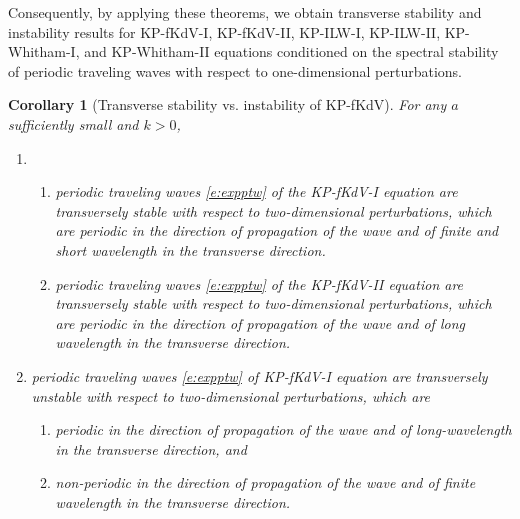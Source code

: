 \documentclass[12pt]{amsart}    %
\newtheorem{corollary}[theorem]{Corollary}
\numberwithin{equation}{section}
\begin{document}
Consequently, by applying these theorems, we obtain transverse stability and instability results for KP-fKdV-I, KP-fKdV-II, KP-ILW-I, KP-ILW-II, KP-Whitham-I, and KP-Whitham-II equations conditioned on the spectral stability of periodic traveling waves with respect to one-dimensional perturbations.
\begin{corollary}[Transverse stability vs. instability of KP-fKdV]\label{c:fkdv}
For any $a$ sufficiently small and $k>0$, 
\begin{enumerate}
\item 
\begin{enumerate}
    \item periodic traveling waves \eqref{e:expptw} of the KP-fKdV-I equation are transversely stable with respect to two-dimensional perturbations, which are periodic in the direction of propagation of the wave and of finite and short wavelength in the transverse direction.
    \item periodic traveling waves \eqref{e:expptw} of the KP-fKdV-II equation are transversely stable with respect to two-dimensional perturbations, which are periodic in the direction of propagation of the wave and of long wavelength in the transverse direction. 
\end{enumerate}
\item  periodic traveling waves \eqref{e:expptw} of KP-fKdV-I equation are transversely unstable with respect to two-dimensional perturbations, which are 
    \begin{enumerate}
        \item periodic in the direction of propagation of the wave and of long-wavelength in the transverse direction, and
        \item non-periodic in the direction of propagation of the wave and of finite wavelength in the transverse direction.
    \end{enumerate}
\end{enumerate}
\end{corollary}
\end{document}
